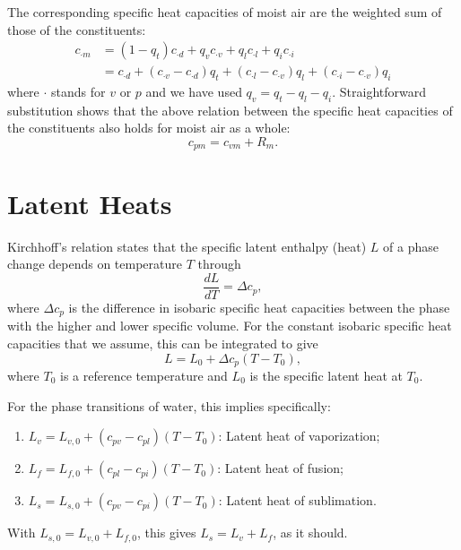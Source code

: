 \documentclass{report}
\begin{document}
The corresponding specific heat capacities of moist air are the weighted sum of those of the constituents:
\begin{align}
    c_{\cdot m} & = (1-q_t) c_{\cdot d} + q_v c_{\cdot v} + q_l c_{\cdot l} + q_i c_{\cdot i} \label{e:specific_heat}\\
    & = c_{\cdot d} + (c_{\cdot v} - c_{\cdot d})q_t + (c_{\cdot l} - c_{\cdot v})q_l + (c_{\cdot i} - c_{\cdot v})q_i
\end{align}
where $\cdot$ stands for $v$ or $p$ and we have used $q_v = q_t -q_l - q_i$. Straightforward substitution shows that the above relation between the specific heat capacities of the constituents also holds for moist air as a whole:
\begin{equation}\label{e:specific_heat_relation}
    c_{pm} = c_{vm} + R_m.
\end{equation}

\section{Latent Heats}

Kirchhoff's relation states that the specific latent enthalpy (heat) $L$ of a phase change depends on temperature $T$ through
\begin{equation}
    \frac{dL}{dT} = \Delta c_p,
\end{equation}
where $\Delta c_p$ is the difference in isobaric specific heat capacities between the phase with the higher and lower specific volume. For the constant isobaric specific heat capacities that we assume, this can be integrated to give
\begin{equation}
    L = L_0 + \Delta c_p (T-T_0),
    \label{eq:LH_temperature}
\end{equation}
where $T_0$ is a reference temperature and $L_0$ is the specific latent heat at $T_0$. 

For the phase transitions of water, this implies specifically:
\begin{enumerate}
    \item $L_v = L_{v,0} + (c_{pv} - c_{pl}) (T - T_0)$: Latent heat of vaporization;
    \item $L_f = L_{f,0} + (c_{pl} - c_{pi}) (T - T_0)$: Latent heat of fusion;
    \item $L_s = L_{s,0} + (c_{pv} - c_{pi}) (T - T_0)$: Latent heat of sublimation.
\end{enumerate}
With $L_{s,0} = L_{v,0} + L_{f,0}$, this gives $L_s = L_v + L_f$, as it should.
\end{document}
